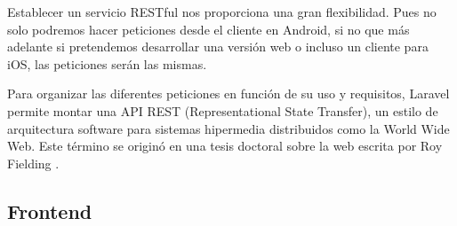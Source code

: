 Establecer un servicio RESTful nos proporciona una gran flexibilidad. Pues no solo podremos hacer peticiones desde el cliente en Android, si no que más adelante si pretendemos desarrollar una versión web o incluso un cliente para iOS, las peticiones serán las mismas.

Para organizar las diferentes peticiones en función de su uso y requisitos, Laravel permite montar una API REST (Representational State Transfer), un estilo de arquitectura software para sistemas hipermedia distribuidos como la World Wide Web. Este término se originó en una tesis doctoral sobre la web escrita por Roy Fielding \cite{ref:RESTPhd}.

  \subsection{Frontend}
